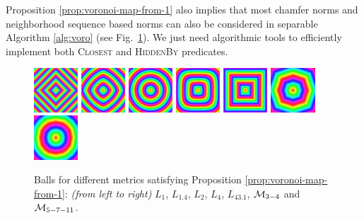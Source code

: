 \documentclass{llncs}
\begin{document}
Proposition
\ref{prop:voronoi-map-from-1} also implies that most chamfer norms and
neighborhood sequence based norms can also be considered in separable
Algorithm \ref{alg:voro} (see Fig.~\ref{fig:metrics}). We just need
algorithmic tools to efficiently implement both \textsc{Closest} and
\textsc{HiddenBy} predicates.
\begin{figure}[htbp]
 {\includegraphics[width=1.65cm]{image-ball-1}}
 {\includegraphics[width=1.65cm]{image-ball-1-4}}
 {\includegraphics[width=1.65cm]{image-ball-2}}
 {\includegraphics[width=1.65cm]{image-ball-4}}
 {\includegraphics[width=1.65cm]{image-ball-43-1}}
 {\includegraphics[width=1.65cm]{image-ball-chamf34}}
 {\includegraphics[width=1.65cm]{image-ball-chamf5711}}
  \caption{Balls for different metrics satisfying Proposition \ref{prop:voronoi-map-from-1}: \emph{(from
      left to right)} $L_1$, $L_{1.4}$, $L_2$, $L_4$, $L_{43.1}$,
    $\mathcal{M}_{3-4}$ and $\mathcal{M}_{5-7-11}$.}
  \label{fig:metrics}
\end{figure}
%
\vspace{-1cm}
\end{document}
